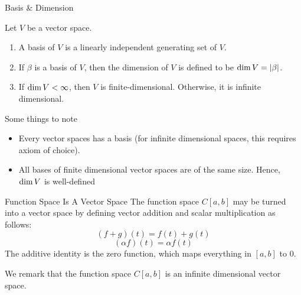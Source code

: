 \documentclass[10pt]{beamer}
\begin{document}
    \begin{frame}{Basis \& Dimension}
        \begin{definition}
            Let $V$ be a vector space. 
            \begin{enumerate}
                \item A \alert{basis} of $V$ is a linearly independent generating set of $V$. 
                \item If $\beta$ is a basis of $V$, then the \alert{dimension} of $V$ is defined to be $\operatorname{dim} V = |\beta|$. 
                \item If $\operatorname{dim} V < \infty$, then $V$ is \alert{finite-dimensional}. Otherwise, it is \alert{infinite dimensional}.
            \end{enumerate}
        \end{definition}
        Some things to note 
        \begin{itemize}
            \item<2-> Every vector spaces has a basis (for infinite dimensional spaces, this requires axiom of choice). 
            \item<3-> All bases of finite dimensional vector spaces are of the same size. Hence, $\operatorname{dim} V$ is well-defined
        \end{itemize}
    \end{frame}

		\begin{frame}{Function Space Is A Vector Space}
				The function space $C[a,b]$ may be turned into a vector space by defining vector addition and scalar multiplication as follows: 
				\begin{equation*}
						(f+g)(t) = f(t) + g(t) 
				\end{equation*}
				\begin{equation*}
						(\alpha f)(t) = \alpha f(t)
				\end{equation*}
				The additive identity is the zero function, which maps everything in $[a,b]$ to 0. 

				\begin{block}{}
						We remark that the function space $C[a,b]$ is an infinite dimensional vector space. 
				\end{block}
		\end{frame}
\end{document}
